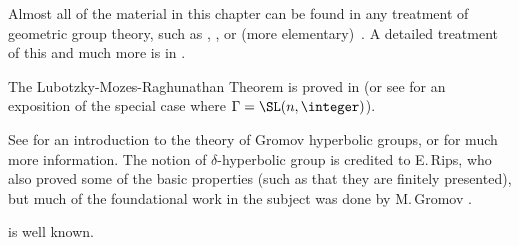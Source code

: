 \begin{notes}

Almost all of the material in this chapter can be found in any treatment of geometric group theory, such as \cite{GhysDelaHarpe-InfGrpsGeomObjs}, \cite{delaHarpe-TopicsGeomGrpThy}, or (more elementary)~\cite{Bowditch-CourseGGT}. A detailed treatment of this and much more is in \cite{BridsonHaefliger}. 

The Lubotzky-Mozes-Raghunathan Theorem  is proved in \cite{LubotzkyMozesRaghunathan} (or see \cite{LubotzkyMozesRaghunathan-CR} for an exposition of the special case where $\Gamma = \SL(n,\integer)$). 

See \cite{Ghys-GrpHyp} for an introduction to the theory of Gromov hyperbolic groups, or \cite{GhysDelaHarpe-GrpsHyp,Gromov-HypGrps} for much more information.
The notion of $\delta$-hyperbolic group is credited to E.\,Rips, who also proved some of the basic properties (such as that they are finitely presented), but much of the foundational work in the subject was done by M.\,Gromov \cite{Gromov-HypGrps}.

 is well known.

\end{notes}


